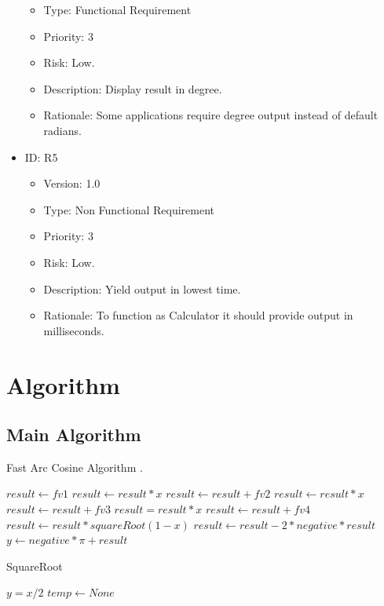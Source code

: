 \documentclass[a4paper,12pt]{article}
\begin{document}
\begin{itemize}
{\begin{itemize}
            \item{Type: Functional Requirement}
            \item{Priority: 3}
            \item {Risk: Low.}
            \item{Description: Display result in degree.}
            \item{Rationale: Some applications require degree output instead of default radians.}
        \end{itemize}}
        \item {ID: R5 
        \begin{itemize}
            \item {Version: 1.0}
            \item{Type: Non Functional Requirement}
            \item{Priority: 3}
            \item {Risk: Low.}
            \item{Description: Yield output in lowest time.}
            \item{Rationale: To function as Calculator it should provide output in milliseconds.}
        \end{itemize}}
    \end{itemize}
\pagebreak

\section{Algorithm}
    \subsection{Main Algorithm}
    \begin{algorithm}
    \caption{Fast Arc Cosine Algorithm \cite{Abramowitz Book}.}
    $result \gets  fv1$\;
    $result \gets result*x$\;
    $result \gets result +  fv2$\;
    $result \gets result*x$\;
    $result \gets result + fv3$\;
    $result= result*x$\;
    $result \gets result + fv4$\;
    $result \gets result* squareRoot(1-x)$\;
    $result \gets result- 2*negative*result$\;
    $y \gets negative * \pi + result$\;
    \end{algorithm}
    \pagebreak
    
    
    \begin{algorithm}
    \caption{SquareRoot}
    $y = x/2$\;
    $temp \gets None$\;
    \end{algorithm}
    
\end{document}
